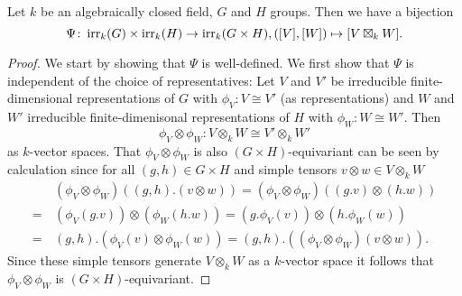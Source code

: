\begin{thrm}
 Let $k$ be an algebraically closed field, $G$ and $H$ groups. Then we have a bijection
 \[
  \Psi \colon \operatorname{irr}_k(G) \times \operatorname{irr}_k(H) \to \operatorname{irr}_k(G \times H), ([V],[W]) \mapsto [V \boxtimes_k W].
 \]
\end{thrm}
\begin{proof}
 We start by showing that $\Psi$ is well-defined. We first show that $\Psi$ is independent of the choice of representatives: Let $V$ and $V'$ be irreducible finite-dimensional representations of $G$ with $\phi_V \colon V \cong V'$ (as representations) and $W$ and $W'$ irreducible finite-dimenisonal representations of $H$ with $\phi_W \colon W \cong W'$. Then
 \[
  \phi_V \otimes \phi_W \colon V \otimes_k W \cong V' \otimes_k W'
 \]
 as $k$-vector spaces. That $\phi_V \otimes \phi_W$ is also $(G \times H)$-equivariant can be seen by calculation since for all $(g,h) \in G \times H$ and simple tensors $v \otimes w \in V \otimes_k W$
 \begin{align*}
   &\, (\phi_V \otimes \phi_W)((g,h).(v \otimes w))
  =    (\phi_V \otimes \phi_W)((g.v) \otimes (h.w)) \\
  =&\, (\phi_V(g.v)) \otimes (\phi_W(h.w))
  =    (g.\phi_V(v)) \otimes (h.\phi_W(w)) \\
  =&\, (g,h).(\phi_V(v) \otimes \phi_W(w))
  =    (g,h).((\phi_V \otimes \phi_W)(v \otimes w)).
 \end{align*}
 Since these simple tensors generate $V \otimes_k W$ as a $k$-vector space it follows that $\phi_V \otimes \phi_W$ is $(G \times H)$-equivariant.
 

\end{proof}

